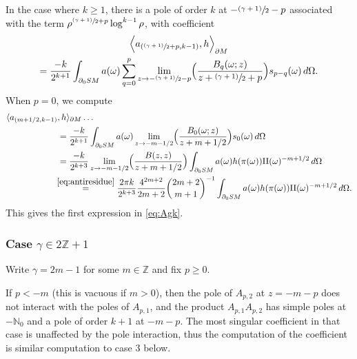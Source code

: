 \documentclass[JEP,XML,SOM,Unicode,NoFloatCountersInSection, NoEqCountersInSection,published]{cedram}
\newcommand{\psfrac}[2]{\sfrac{(#1)}{#2}}
\theoremstyle{plain}
\theoremstyle{definition}
\theoremstyle{remark}
\def\Nm{{\mathbb{N}}}
\def\Zm{{\mathbb{Z}}}
\def\two{\mathrm{II}}
\begin{document}
In the case where $k\ge 1$, there is a pole of order $k$ at $-\sfrac{(\gamma+1)}{2}-p$ associated with the term $\rho^{\psfrac{\gamma+1}{2}+p}\log^{k-1} \rho$, with coefficient
\begin{multline*}
\Bigl\langle a_{(\psfrac{\gamma+1}{2}+p, k-1)}, h\Bigr\rangle_{\partial M}\\
= \frac{-k}{2^{k+1}} \int_{\partial_0 SM} a(\omega)
\sum_{q=0}^p \lim_{z\to -\psfrac{\gamma+1}{2}-p} \Bigl(\frac{B_q(\omega; z)}{z+ \psfrac{\gamma+1}{2}+p}\Bigr) s_{p-q}(\omega)\,d\Omega.
\end{multline*}
When $p=0$, we compute
\begin{align*}
\langle a_{(m+1/2, k-1)}&, h\rangle_{\partial M} \ldots \\
&= \frac{-k}{2^{k+1}} \int_{\partial_0 SM} a(\omega) \lim_{z\to -m-1/2} \Bigl(\frac{B_0(\omega; z)}{z+ m+ 1/2}\Bigr) s_{0}(\omega)\,d\Omega \\
&= \frac{-k}{2^{k+3}} \lim_{z\to -m-1/2} \Bigl(\frac{B(z,z)}{z+ m+ 1/2}\Bigr) \int_{\partial_0 SM} a(\omega) h(\pi(\omega)) \two(\omega)^{-m+1/2} \,d\Omega \\
&\!\!\stackrel{\eqref{eq:antiresidue}}{=} \frac{2\pi k}{2^{k+3}} \frac{4^{2m+2}}{2m+2} \binom{2m+2}{m+1}^{-1} \int_{\partial_0 SM} a(\omega) h(\pi(\omega)) \two(\omega)^{-m+1/2} \,d\Omega.
\end{align*}
This gives the first expression in \eqref{eq:Agk}.

\subsubsection*{Case $\gamma\in 2\Zm + 1$}
Write $\gamma = 2m-1$ for some $m\in \Zm$ and fix $p\ge 0$.

If $p<-m$ (this is vacuous if $m>0$), then the pole of $A_{p,2}$ at $z = -m-p$ does not interact with the poles of $A_{p,1}$, and the product $A_{p,1} A_{p,2}$ has simple poles at $-\Nm_0$ and a pole of order $k+1$ at $-m-p$. The most singular coefficient in that case is unaffected by the pole interaction, thus the computation of the coefficient is similar computation to case 3 below.
\end{document}
